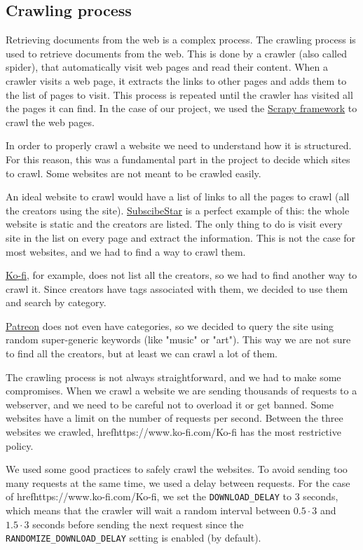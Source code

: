 \documentclass[tikz,14pt]{article}
\begin{document}
\subsection{Crawling process} \label{sec:crawling}
Retrieving documents from the web is a complex process. 
The crawling process is used to retrieve documents from the web.
This is done by a crawler (also called spider), that automatically visit web pages and read their content.
When a crawler visits a web page, it extracts the links to other pages and adds them to the list of pages to visit.
This process is repeated until the crawler has visited all the pages it can find.
In the case of our project, we used the \href{https://scrapy.org/}{Scrapy framework} to crawl the web pages.

In order to properly crawl a website we need to understand how it is structured.
For this reason, this was a fundamental part in the project to decide which sites to crawl.
Some websites are not meant to be crawled easily.

An ideal website to crawl would have a list of links to all the pages to crawl (all the creators using the site).
\href{https://www.subscribestar.com/stars?_page=true&page=1}{SubscibeStar} is a perfect example of this:
the whole website is static and the creators are listed. 
The only thing to do is visit every site in the list on every page and extract the information.
This is not the case for most websites, and we had to find a way to crawl them.


\href{https://www.ko-fi.com/}{Ko-fi}, for example, does not list all the creators, so we had to find another way to crawl it.
Since creators have tags associated with them, we decided to use them and search by category.

\href{https://www.patreon.com/}{Patreon} does not even have categories, 
so we decided to query the site using random super-generic keywords (like "music" or "art").
This way we are not sure to find all the creators, but at least we can crawl a lot of them.

The crawling process is not always straightforward, and we had to make some compromises.
When we crawl a website we are sending thousands of requests to a webserver, and we need to be careful not to overload it or get banned.
Some websites have a limit on the number of requests per second.
Between the three websites we crawled, href{https://www.ko-fi.com/}{Ko-fi} has the most restrictive policy.

We used some good practices to safely crawl the websites. To avoid sending too many requests at the same time, we used a delay between requests.
For the case of href{https://www.ko-fi.com/}{Ko-fi}, we set the \texttt{DOWNLOAD_DELAY} to 3 seconds,
which means that the crawler will wait a random interval between $0.5 \cdot 3$ and $1.5 \cdot 3$ seconds 
before sending the next request since the \texttt{RANDOMIZE_DOWNLOAD_DELAY} setting is enabled (by default).
\end{document}
